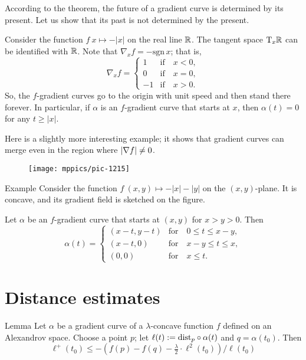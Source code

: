 According to the theorem, the future of a gradient curve is determined by its present.
Let us show that its past is not determined by the present.

Consider the function $f\:x\mapsto -|x|$ on the real line $\mathbb{R}$.
The tangent space $\mathrm{T}_x\mathbb{R}$ can be identified with $\mathbb{R}$.
Note that $\nabla_xf=-\mathrm{sgn}\, x$; that is,
\[\nabla_xf=
\begin{cases}
1&\text{if}\quad x<0,
\\
0&\text{if}\quad x=0,
\\
-1&\text{if}\quad x>0.
\end{cases}
\]
So, the $f$-gradient curves go to the origin with unit speed and then stand there forever.
In particular, if $\alpha$ is an $f$-gradient curve that starts at $x$,
then $\alpha(t)=0$ for any $t\ge |x|$.

Here is a slightly more interesting example;
it shows that gradient curves can merge even in the region where $|\nabla f|\ne 0$. 


\begin{wrapfigure}[8]{r}{34 mm}
\vskip-0mm
\centering
\texttt{[image: mppics/pic-1215]}
\vskip0mm
\end{wrapfigure}

\begin{thm}{Example}
Consider the function $f\:(x,y)\mapsto-|x|-|y|$ on the $(x,y)$-plane.
It is concave, and its gradient field is sketched on the figure.

Let $\alpha$ be an $f$-gradient curve that starts at $(x,y)$ for $x>y>0$.
Then 
\[\alpha(t)=
\begin{cases}
(x-t,y-t) &\text{for}\quad 0\le t\le  x-y,
\\
(x-t,0) &\text{for}\quad x-y\le t\le  x,
\\
(0,0) &\text{for}\quad x\le t.
\end{cases}
\]

\end{thm}


\section{Distance estimates}

\begin{thm}{Lemma}\label{eq:fist-var-inq+}
Let $\alpha$ be a gradient curve of a $\lambda$-concave function $f$
defined on an Alexandrov space.
Choose a point $p$; let $\ell(t)\mathrel{:=}\mathrm{dist}_p\circ\alpha(t)$ and $q=\alpha(t_0)$.
Then 
\[
\ell^+(t_0)\le -\left({f(p)}-{f(q)}-\tfrac\lambda2\cdot\ell^2(t_0)\right)/\ell(t_0)
\]
\end{thm}

